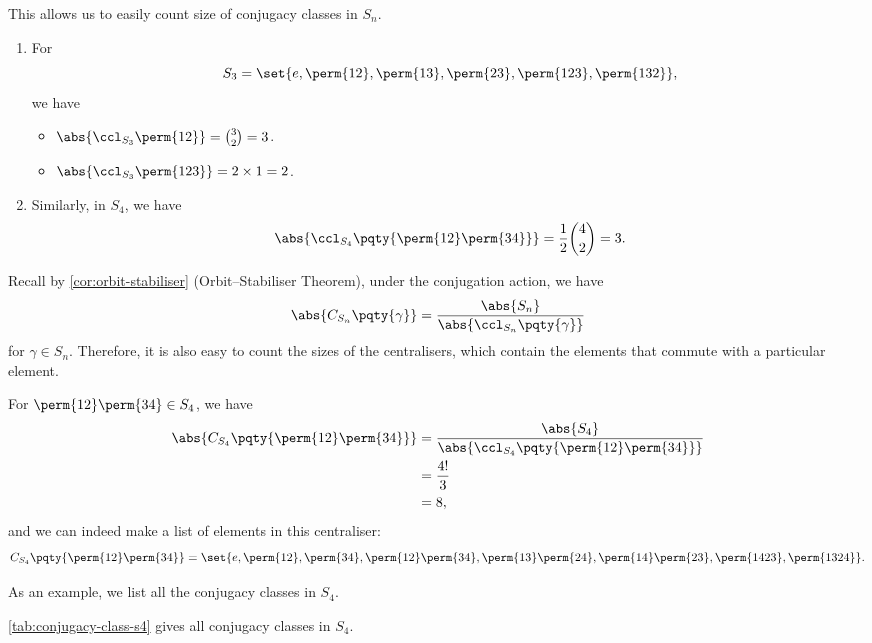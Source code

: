 This allows us to easily count size of conjugacy classes in \(S_n\).

\begin{examples*}
    \begin{enumerate}
        \item For
        \[
            S_3 = \set{e, \perm{12}, \perm{13}, \perm{23}, \perm{123}, \perm{132}},
        \]
        we have
        \begin{itemize}
            \item \(\abs{\ccl_{S_3} \perm{12}} = \binom{3}{2} = 3\).
            \item \(\abs{\ccl_{S_3} \perm{123}} = 2 \times 1 = 2\).
        \end{itemize}

        \item Similarly, in \(S_4\), we have
        \[
            \abs{\ccl_{S_4} \pqty{\perm{12} \perm{34}}} = \frac{1}{2} \binom{4}{2} = 3.
        \]
    \end{enumerate}
\end{examples*}

Recall by \autoref{cor:orbit-stabiliser} (Orbit--Stabiliser Theorem), under the conjugation action, we have
\[
    \abs{C_{S_n} \pqty{\gamma}} = \frac{\abs{S_n}}{\abs{\ccl_{S_n} \pqty{\gamma}}}
\]
for \(\gamma \in S_n\). Therefore, it is also easy to count the sizes of the centralisers, which contain the elements that commute with a particular element.

\begin{example*}
    For \(\perm{12}\perm{34} \in S_4\), we have
    \begin{align*}
        \abs{C_{S_4} \pqty{\perm{12} \perm{34}}} &= \frac{\abs{S_4}}{\abs{\ccl_{S_4} \pqty{\perm{12} \perm{34}}}} \\
        &= \frac{4!}{3} \\
        &= 8,
    \end{align*}
    and we can indeed make a list of elements in this centraliser:
    \[
        C_{S_4} \pqty{\perm{12}\perm{34}} = \set{
            e, \perm{12}, \perm{34}, \perm{12}\perm{34}, \perm{13}\perm{24}, \perm{14}\perm{23}, \perm{1423}, \perm{1324}
        }.
    \]
\end{example*}

As an example, we list all the conjugacy classes in \(S_4\).

\begin{example*}
    \autoref{tab:conjugacy-class-s4} gives all conjugacy classes in \(S_4\).
\end{example*}

